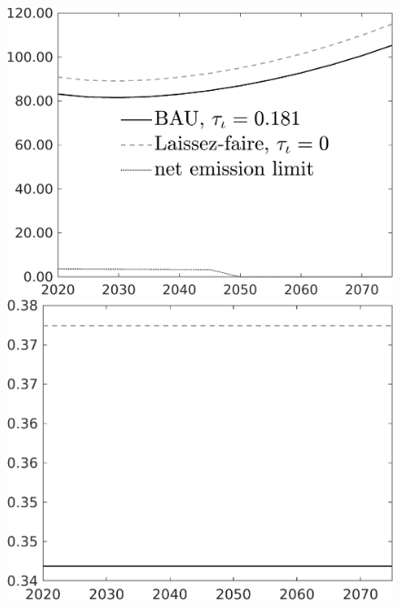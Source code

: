 \documentclass[12pt]{article}
\begin{document}
\begin{figure}[h!!]
	\begin{minipage}[]{0.32\textwidth}
		\includegraphics[width=1\textwidth]{../../codding_model/own_basedOnFried/optimalPol_010922_revision/figures/all_13Sept22/CompTaul_Equlab_LFBAU_Reg0_Emnet_spillover0_nsk1_xgr1_knspil0_sep1_countec0_GovRev0_etaa0.79_lgd1.png}
	\end{minipage}	
	\begin{minipage}[]{0.32\textwidth}
		\includegraphics[width=1\textwidth]{../../codding_model/own_basedOnFried/optimalPol_010922_revision/figures/all_13Sept22/CompTaul_Equlab_LFBAU_Reg0_hh_spillover0_nsk1_xgr1_knspil0_sep1_countec0_GovRev0_etaa0.79_lgd0.png}

\end{minipage}
\end{figure}
\end{document}
